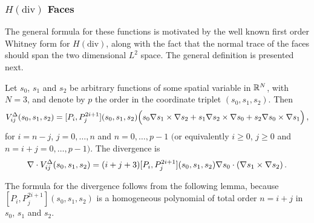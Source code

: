 \subsubsection{\texorpdfstring{$H(\mathrm{div})$}{Hdiv} Faces}

The general formula for these functions is motivated by the well known first order Whitney form for $H(\mathrm{div})$, along with the fact that the normal trace of the faces should span the two dimensional $L^2$ space. The general definition is presented next.

\begin{definition*}
Let $s_0$, $s_1$ and $s_2$ be arbitrary functions of some spatial variable in $\mathbb{R}^N$, with $N=3$, and denote by $p$ the order in the coordinate triplet $(s_0,s_1,s_2)$. Then
\begin{equation}
	V_{ij}^{\Delta}(s_0,s_1,s_2)=[P_i,P_j^{2i+1}](s_0,s_1,s_2)\Big(s_0\nabla s_1\times\nabla s_2
		+s_1\nabla s_2\times\nabla s_0+s_2\nabla s_0\times\nabla s_1\Big)\,,
\end{equation}
for $i=n-j$, $j=0,\ldots,n$ and $n=0,\ldots,p-1$ $($or equivalently $i\geq0$, $j\geq0$ and $n=i+j=0,\ldots,p-1$$)$. The divergence is
\begin{equation}
	\nabla\cdot V_{ij}^{\Delta}(s_0,s_1,s_2)=(i+j+3)[P_i,P_j^{2i+1}](s_0,s_1,s_2)\nabla s_0\cdot(\nabla s_1\times\nabla s_2) \,.
	\label{eq:VdeltaDiv}
\end{equation}
\end{definition*}

The formula for the divergence follows from the following lemma, because $[P_i,P_j^{2i+1}](s_0,s_1,s_2)$ is a homogeneous polynomial of total order $n=i+j$ in $s_0$, $s_1$ and $s_2$.

